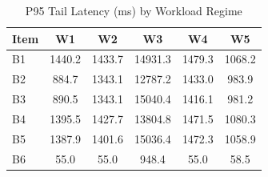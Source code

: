 \begin{table}[htbp]
\centering
\caption{P95 Tail Latency (ms) by Workload Regime}
\label{tab:p95_latency}
\begin{tabular}{lccccc}
\hline
Item & W1 & W2 & W3 & W4 & W5 \\
\hline
B1 & 1440.2 & 1433.7 & 14931.3 & 1479.3 & 1068.2 \\
B2 & 884.7 & 1343.1 & 12787.2 & 1433.0 & 983.9 \\
B3 & 890.5 & 1343.1 & 15040.4 & 1416.1 & 981.2 \\
B4 & 1395.5 & 1427.7 & 13804.8 & 1471.5 & 1080.3 \\
B5 & 1387.9 & 1401.6 & 15036.4 & 1472.3 & 1058.9 \\
B6 & 55.0 & 55.0 & 948.4 & 55.0 & 58.5 \\
\hline
\end{tabular}
\end{table}